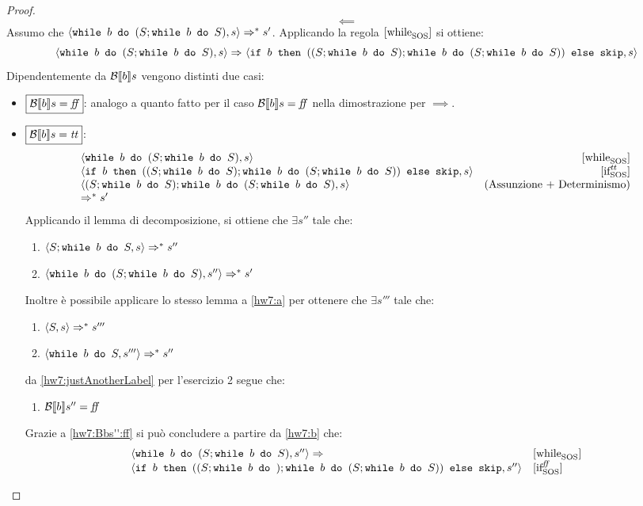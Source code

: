 {\begin{proof}

$$
\boxed{\impliedby}
$$
Assumo che $\confSs{\wbS{b}{(S;\wbS{b}{S})}}{s} \Rar{*} s'$.
Applicando la regola $\whileSOS$ si ottiene:
$$\confSs{\wbS{b}{(S;\wbS{b}{S})}}{s}
	\Rar{ }
	\confSs{\ifABC{b}{((S; \wbS{b}{S});\wbS{b}{(S;\wbS{b}{S})})}{\skipForFriends}}{s}$$
Dipendentemente da $\B{b}$ vengono distinti due casi:
\begin{itemize}
	\item $\boxed{\B{b} = \semfalse}$: analogo a quanto fatto per il caso $\B{b} = \semfalse $ nella dimostrazione per $\boxed{\implies}$. 
	\item $\boxed{\B{b} = \semtrue}$:
	$$
	\begin{array}{lr}
	\confSs{\wbS{b}{(S; \wbS{b}{S})}}{s} & \whileSOS \\
	\confSs{\ifABC{b}{((S; \wbS{b}{S});\wbS{b}{(S;\wbS{b}{S})})}{\skipForFriends}}{s} & \ifttSOS \\
	\confSs{(S; \wbS{b}{S}); \wbS{b}{(S; \wbS{b}{S})}}{s} & \text{(Assunzione + Determinismo)}\\
	\Rar{*} s'
	\end{array}
	$$
	Applicando il lemma di decomposizione, si ottiene che $\exists s''$ tale che:
	\begin{enumerate}[label=(\arabic*)]
		\item $\confSs{S; \wbS{b}{S}}{s} \Rar{*} s''$
		\label{hw7:a}
		\item $\confSs{\wbS{b}{(S; \wbS{b}{S}})}{s''} \Rar{*} s'$
		\label{hw7:b}
	\end{enumerate}
	Inoltre è possibile applicare lo stesso lemma a \ref{hw7:a} per ottenere che
	$\exists s'''$ tale che:
	\begin{enumerate}[label=(\Alph*)]
		\item $\confSs{S}{s} \Rar{*} s'''$
		\item $\confSs{\wbS{b}{S}}{s'''} \Rar{*}s''$
		\label{hw7:justAnotherLabel}
	\end{enumerate}
	da \ref{hw7:justAnotherLabel} per l'esercizio 2 segue che:
	\begin{enumerate}[label=(\Roman*)]
		\item $\B{b}'' = \semfalse$
		\label{hw7:Bbs'':ff}
	\end{enumerate}
	Grazie a \ref{hw7:Bbs'':ff} si può concludere a partire da \ref{hw7:b} che:
	$$
	\begin{array}{ll}
		\confSs{\wbS{b}{(S; \wbS{b}{S})}}{s''} \Rar{ }& \whileSOS \\
		\confSs{\ifABC{b}{((S; \wbS{b}); \wbS{b}{(S; \wbS{b}{S})})}{\skipForFriends}}{s''} & \ifffSOS \\

\end{array}$$
\end{itemize}
\end{proof}}
